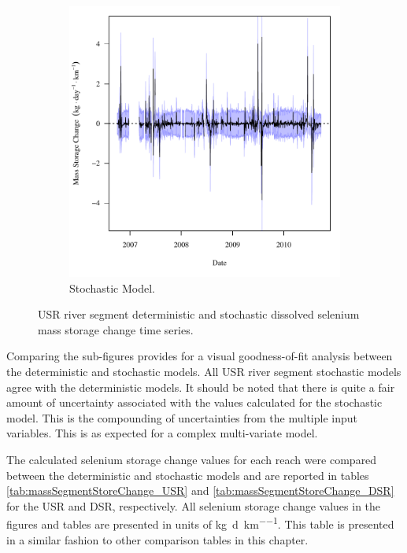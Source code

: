 \begin{linenumbers}
\begin{landscape}
\begin{figure}
\begin{subfigure}{0.7\textwidth}
			\includegraphics[width=\tableCustomSize]{"Figures/Results_DSR/Stochastic/f Segment G"}
			\caption{Stochastic Model.}
		\end{subfigure}
		\caption{USR river segment deterministic and stochastic dissolved selenium mass storage change time series.}
	\end{figure}
\end{landscape}
\subfiguretop

Comparing the sub-figures provides for a visual goodness-of-fit analysis between the deterministic and stochastic models.  All USR river segment stochastic models agree with the deterministic models.  It should be noted that there is quite a fair amount of uncertainty associated with the values calculated for the stochastic model.  This is the compounding of uncertainties from the multiple input variables.  This is as expected for a complex multi-variate model.

The calculated selenium storage change values for each reach were compared between the deterministic and stochastic models and are reported in tables \ref{tab:massSegmentStoreChange_USR} and \ref{tab:massSegmentStoreChange_DSR} for the USR and DSR, respectively.  All selenium storage change values in the figures and tables are presented in units of \si{\kilo\gram\per\day\per\kilo\meter}.  This table is presented in a similar fashion to other comparison tables in this chapter.


\end{linenumbers}
